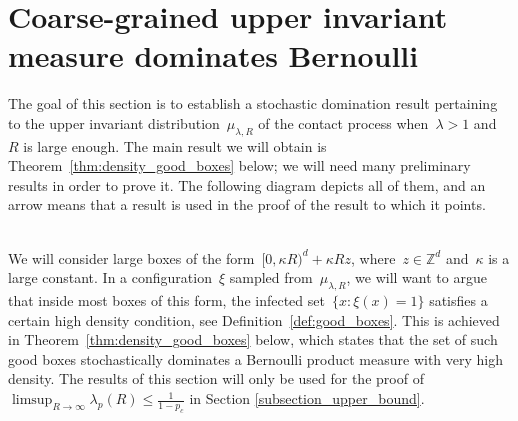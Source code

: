 \documentclass[a4paper,12pt]{article}
\newcommand{\Z}{\mathbb{Z}}
\begin{document}
\section{Coarse-grained upper invariant measure dominates Bernoulli}\label{section_domination_liggett_steif}
\label{s:domination}




The goal of this section is to establish a stochastic domination result pertaining to the upper invariant distribution~${\mu}_{\lambda, R}$ of the contact process when~$\lambda > 1$ and~$R$ is large enough.
The main result we will obtain is Theorem~\ref{thm:density_good_boxes} below; we will need many preliminary results in order to prove it. The following diagram depicts all of them, and an arrow means that a result is used in the proof of the result to which it points.

\\

 We will consider large boxes of the form~$ [0,\kappa R)^d + \kappa R z$, where~$z \in \Z^d$ and~$\kappa$ is a large constant. In a configuration~$\xi$ sampled from~${\mu}_{\lambda,R}$, we will want to argue that inside most boxes of this form, the infected set~$\{x:\xi(x) = 1\}$ satisfies a certain high density condition, see Definition~\ref{def:good_boxes}.  This is achieved in Theorem~\ref{thm:density_good_boxes} below, which states that the set of such good boxes stochastically dominates a Bernoulli product measure with very high density.
The results of this section  will only be used for the proof of $\limsup_{R \to \infty } \lambda_p(R) \leq \frac{1}{1-p_c}$ in Section \ref{subsection_upper_bound}.
\end{document}

